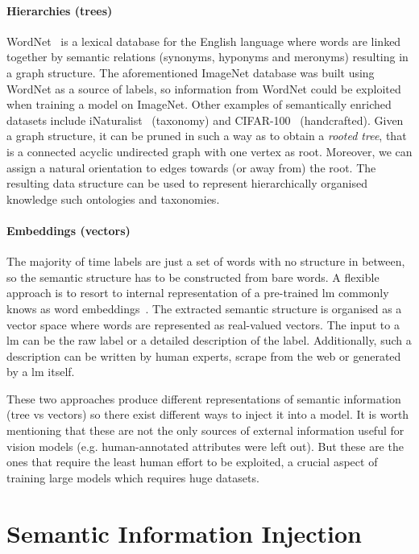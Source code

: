 \paragraph{Hierarchies (trees)}
\label{par:hierarchies-tree}
WordNet~\cite{WordnetMi1995} is a lexical database for the English language
where words are linked together by semantic relations (synonyms, hyponyms and
meronyms) resulting in a graph structure. The aforementioned ImageNet database
was built using WordNet as a source of labels, so information from WordNet could
be exploited when training a model on ImageNet. Other examples of semantically
enriched datasets include iNaturalist~\cite{TheInaturalistHorn2017} (taxonomy)
and CIFAR-100~\cite{LearningMultipKrizhe2009} (handcrafted). Given a graph
structure, it can be pruned in such a way as to obtain a \emph{rooted tree},
that is a connected acyclic undirected graph with one vertex as root. Moreover,
we can assign a natural orientation to edges towards (or away from) the root.
The resulting data structure can be used to represent hierarchically organised
knowledge such ontologies and taxonomies.

\paragraph{Embeddings (vectors)}
\label{par:embeddings-vectors}
The majority of time labels are just a set of words with no structure in
between, so the semantic structure has to be constructed from bare words. A
flexible approach is to resort to internal representation of a pre-trained
\acrfull{lm} commonly knows as word embeddings~\cite{BeyondWordEmbIncitt2023}.
The extracted semantic structure is organised as a vector space where words are
represented as real-valued vectors. The input to a \acrshort{lm} can be the raw
label or a detailed description of the label. Additionally, such a description
can be written by human experts, scrape from the web or generated by a
\acrshort{lm} itself.\medskip

These two approaches produce different representations of semantic information
(tree vs vectors) so there exist different ways to inject it into a model. It is
worth mentioning that these are not the only sources of external information
useful for vision models (e.g. human-annotated attributes were left out). But
these are the ones that require the least human effort to be exploited, a
crucial aspect of training large models which requires huge datasets.

\section{Semantic Information Injection}
\label{sec:semantic-information-injection}

